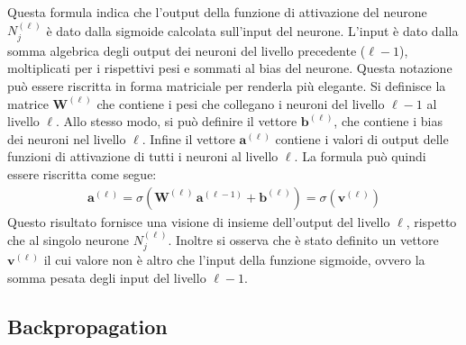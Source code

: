 \noindent Questa formula indica che l'output della funzione di attivazione del neurone $N^{(\ell)}_j$ è dato dalla sigmoide calcolata sull'input del neurone. L'input è dato dalla somma algebrica degli output dei neuroni del livello precedente ($\ell - 1$), moltiplicati per i rispettivi pesi e sommati al bias del neurone. Questa notazione può essere riscritta in forma matriciale per renderla più elegante. Si definisce la matrice $\mathbf{W}^{(\ell)}$ che contiene i pesi che collegano i neuroni del livello $\ell-1$ al livello $\ell$. Allo stesso modo, si può definire il vettore $\mathbf{b}^{(\ell)}$, che contiene i bias dei neuroni nel livello $\ell$. Infine il vettore $\mathbf{a}^{(\ell)}$ contiene i valori di output delle funzioni di attivazione di tutti i neuroni al livello $\ell$. La formula può quindi essere riscritta come segue:
% 
\begin{gather*}
    \mathbf{a}^{(\ell)} = \sigma\left( \mathbf{W}^{(\ell)}\, \mathbf{a}^{(\ell -1)} + \mathbf{b}^{(\ell)}\right) = \sigma\left( \mathbf{v}^{(\ell)}\right)
\end{gather*}
% 
\noindent Questo risultato fornisce una visione di insieme dell'output del livello $\ell$, rispetto che al singolo neurone $N^{(\ell)}_j$. Inoltre si osserva che è stato definito un vettore $\mathbf{v}^{(\ell)}$ il cui valore non è altro che l'input della funzione sigmoide, ovvero la somma pesata degli input del livello $\ell - 1$.

\subsection{Backpropagation}

